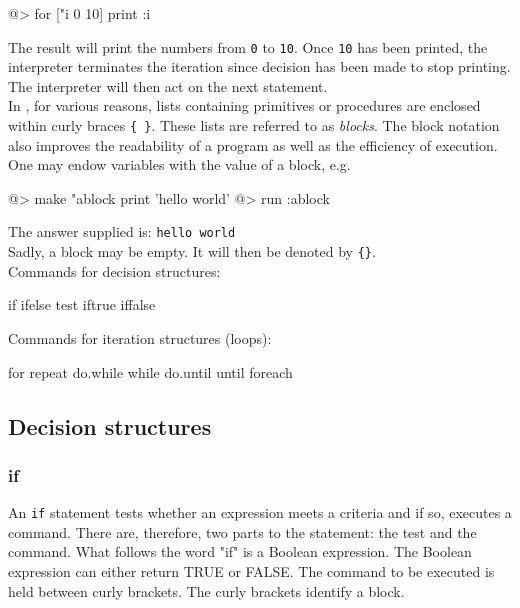 \begin{verbatimtab}
@> for ["i 0 10] {print :i} 
\end{verbatimtab}
 
The result will print the numbers from \verb+0+ to \verb+10+. Once \verb+10+ has been printed, the interpreter terminates the iteration since decision has been made to stop printing.  The interpreter will then act on the next statement.\\ 
 
In \squirrel, for various reasons, lists containing primitives or procedures are enclosed within curly braces \verb+{ }+.  These lists are referred to as {\em blocks}.  The block notation also improves the readability of a program as well as the efficiency of execution.\\ 
 
One may endow variables with the value of a block, e.g. 
 
\begin{verbatimtab}
@> make  "ablock {print 'hello world'}  
@> run :ablock 
\end{verbatimtab}

The answer supplied is:  \verb+hello world+\\
 
Sadly, a block may be empty.  It will then be denoted by \verb+{}+.\\  
 
Commands for decision structures: 
 
\begin{verbatimtab}
if  
ifelse  
test  
iftrue  
iffalse  
\end{verbatimtab}
 
Commands for iteration structures (loops):  
 
\begin{verbatimtab}
for  
repeat  
do.while  
while  
do.until  
until  
foreach
\end{verbatimtab}
 
\subsection{Decision structures} 
  
\subsubsection*{if} 

An \verb+if+ statement tests whether an expression meets a criteria and if so,
executes a command.  There are, therefore, two parts to the statement: the
test and the command.  What follows the word "if" is a Boolean expression.  The Boolean expression can either return TRUE or FALSE.  The command to be executed is held between curly brackets.  The curly brackets identify a block.\\
  
